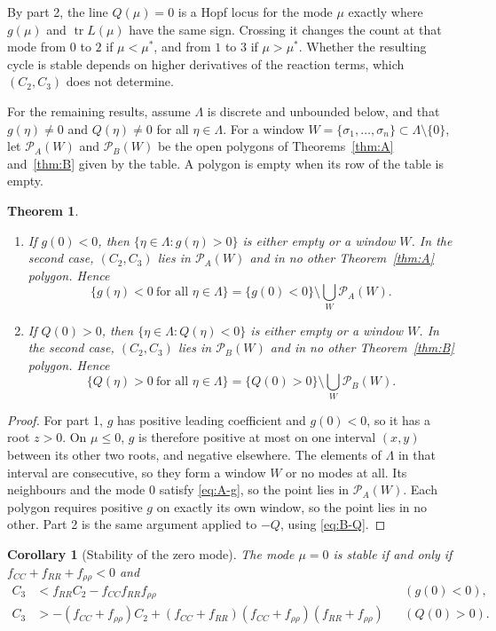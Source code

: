 \documentclass[11pt]{article}
\newtheorem{theorem}{Theorem}
\newtheorem{corollary}{Corollary}
\theoremstyle{remark}
\begin{document}
By part 2, the line $Q(\mu)=0$ is a Hopf locus for the mode $\mu$ exactly where $g(\mu)$ and $\operatorname{tr}L(\mu)$ have the same sign. Crossing it changes the count at that mode from $0$ to $2$ if $\mu<\mu^*$, and from $1$ to $3$ if $\mu>\mu^*$. Whether the resulting cycle is stable depends on higher derivatives of the reaction terms, which $(C_2,C_3)$ does not determine.

\medskip

For the remaining results, assume $\Lambda$ is discrete and unbounded below, and that $g(\eta)\neq0$ and $Q(\eta)\neq0$ for all $\eta\in\Lambda$. For a window $W=\{\sigma_1,\dots,\sigma_n\}\subset\Lambda\setminus\{0\}$, let $\mathcal{P}_A(W)$ and $\mathcal{P}_B(W)$ be the open polygons of Theorems~\ref{thm:A} and~\ref{thm:B} given by the table. A polygon is empty when its row of the table is empty.

\begin{theorem}\label{thm:complement}
\begin{enumerate}
\item If $g(0)<0$, then $\{\eta\in\Lambda:g(\eta)>0\}$ is either empty or a window $W$. In the second case, $(C_2,C_3)$ lies in $\mathcal{P}_A(W)$ and in no other Theorem~\ref{thm:A} polygon. Hence
\[
\{g(\eta)<0\ \text{for all }\eta\in\Lambda\}=\{g(0)<0\}\setminus\bigcup_W\mathcal{P}_A(W).
\]
\item If $Q(0)>0$, then $\{\eta\in\Lambda:Q(\eta)<0\}$ is either empty or a window $W$. In the second case, $(C_2,C_3)$ lies in $\mathcal{P}_B(W)$ and in no other Theorem~\ref{thm:B} polygon. Hence
\[
\{Q(\eta)>0\ \text{for all }\eta\in\Lambda\}=\{Q(0)>0\}\setminus\bigcup_W\mathcal{P}_B(W).
\]
\end{enumerate}
\end{theorem}

\begin{proof}
For part 1, $g$ has positive leading coefficient and $g(0)<0$, so it has a root $z>0$. On $\mu\le0$, $g$ is therefore positive at most on one interval $(x,y)$ between its other two roots, and negative elsewhere. The elements of $\Lambda$ in that interval are consecutive, so they form a window $W$ or no modes at all. Its neighbours and the mode $0$ satisfy \eqref{eq:A-g}, so the point lies in $\mathcal{P}_A(W)$. Each polygon requires positive $g$ on exactly its own window, so the point lies in no other. Part 2 is the same argument applied to $-Q$, using \eqref{eq:B-Q}.
\end{proof}

\begin{corollary}[Stability of the zero mode]\label{cor:zero}
The mode $\mu=0$ is stable if and only if $f_{CC}+f_{RR}+f_{\rho\rho}<0$ and
\begin{align*}
C_3&<f_{RR}C_2-f_{CC}f_{RR}f_{\rho\rho} && (g(0)<0),\\
C_3&>-(f_{CC}+f_{\rho\rho})C_2+(f_{CC}+f_{RR})(f_{CC}+f_{\rho\rho})(f_{RR}+f_{\rho\rho}) && (Q(0)>0).
\end{align*}
\end{corollary}
\end{document}
